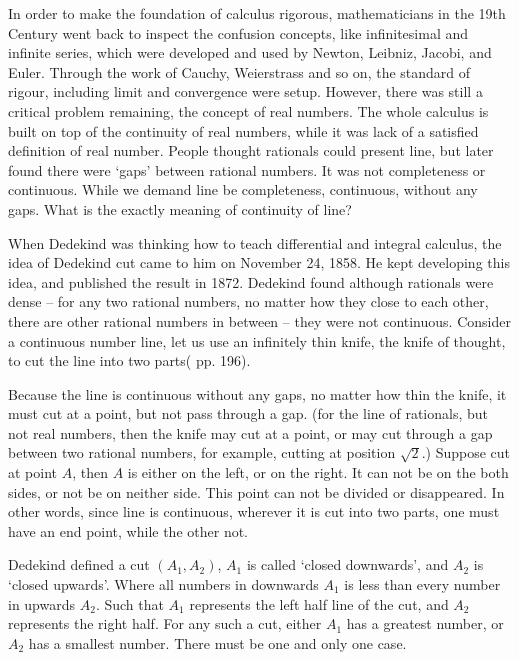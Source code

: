 \documentclass{article}
\begin{document}
In order to make the foundation of calculus rigorous, mathematicians in the 19th Century went back to inspect the confusion concepts, like infinitesimal and infinite series, which were developed and used by Newton, Leibniz, Jacobi, and Euler. Through the work of Cauchy, Weierstrass and so on, the standard of rigour, including limit and convergence were setup. However, there was still a critical problem remaining, the concept of real numbers. The whole calculus is built on top of the continuity of real numbers, while it was lack of a satisfied definition of real number. People thought rationals could present line, but later found there were `gaps' between rational numbers. It was not completeness or continuous. While we demand line be completeness, continuous, without any gaps. What is the exactly meaning of continuity of line?

When Dedekind was thinking how to teach differential and integral calculus, the idea of Dedekind cut came to him on November 24, 1858. He kept developing this idea, and published the result in 1872. Dedekind found although rationals were dense -- for any two rational numbers, no matter how they close to each other, there are other rational numbers in between -- they were not continuous. Consider a continuous number line, let us use an infinitely thin knife, the knife of thought, to cut the line into two parts(\cite{HanXueTao16} pp. 196).

Because the line is continuous without any gaps, no matter how thin the knife, it must cut at a point, but not pass through a gap. (for the line of rationals, but not real numbers, then the knife may cut at a point, or may cut through a gap between two rational numbers, for example, cutting at position $\sqrt{2}$.) Suppose cut at point $A$, then $A$ is either on the left, or on the right. It can not be on the both sides, or not be on neither side. This point can not be divided or disappeared. In other words, since line is continuous, wherever it is cut into two parts, one must have an end point, while the other not.

Dedekind defined a cut $(A_1, A_2)$, $A_1$ is called `closed downwards', and $A_2$ is `closed upwards'. Where all numbers in downwards $A_1$ is less than every number in upwards $A_2$. Such that $A_1$ represents the left half line of the cut, and $A_2$ represents the right half. For any such a cut, either $A_1$ has a greatest number, or $A_2$ has a smallest number. There must be one and only one case.
\end{document}

